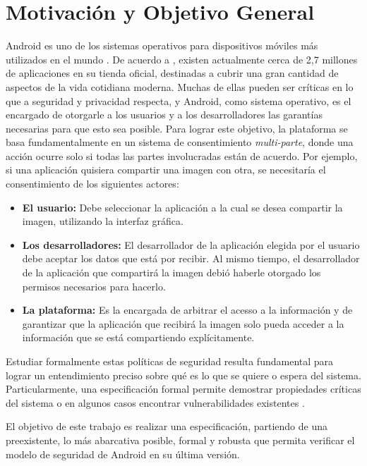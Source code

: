 \section{Motivación y Objetivo General}

Android es uno de los sistemas operativos para dispositivos móviles más
utilizados en el mundo \cite{1,2}. De acuerdo a \cite{3}, existen actualmente
cerca de 2,7 millones de aplicaciones en su tienda oficial, destinadas a cubrir
una gran cantidad de aspectos de la vida cotidiana moderna. Muchas de ellas
pueden ser críticas en lo que a seguridad y privacidad respecta, y Android, como
sistema operativo, es el encargado de otorgarle a los usuarios y a los
desarrolladores las garantías necesarias para que esto sea posible. Para lograr
este objetivo, la plataforma se basa fundamentalmente en un sistema de
consentimiento \textit{multi-parte}, donde una acción ocurre solo si todas las
partes involucradas están de acuerdo. Por ejemplo, si una aplicación quisiera
compartir una imagen con otra, se necesitaría el consentimiento de los
siguientes actores:

\begin{itemize}
   \item \textbf{El usuario: } Debe seleccionar la aplicación a la cual se desea
   compartir la imagen, utilizando la interfaz gráfica.
   \item \textbf{Los desarrolladores: } El desarrollador de la aplicación
   elegida por el usuario debe aceptar los datos que está por recibir. Al mismo
   tiempo, el desarrollador de la aplicación que compartirá la imagen debió
   haberle otorgado los permisos necesarios para hacerlo.
   \item \textbf{La plataforma: } Es la encargada de arbitrar el acesso a la
   información y de garantizar que la aplicación que recibirá la imagen solo pueda
   acceder a la información que se está compartiendo explícitamente.
\end{itemize}


Estudiar formalmente estas políticas de seguridad resulta fundamental para
lograr un entendimiento preciso sobre qué es lo que se quiere o espera del
sistema. Particularmente, una especificación formal permite demostrar
propiedades críticas del sistema o en algunos casos encontrar vulnerabilidades
existentes \cite{alloy}.

El objetivo de este trabajo es realizar una especificación, partiendo de una
preexistente, lo más abarcativa posible, formal y robusta que permita verificar
el modelo de seguridad de Android en su última versión.
